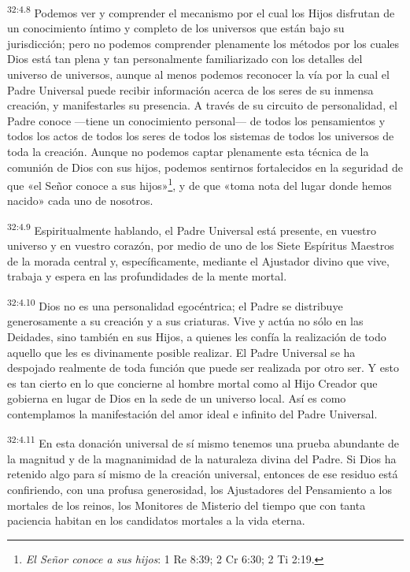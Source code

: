 \par
\textsuperscript{32:4.8} Podemos ver y comprender el mecanismo por el cual los Hijos disfrutan de un conocimiento íntimo y completo de los universos que están bajo su jurisdicción; pero no podemos comprender plenamente los métodos por los cuales Dios está tan plena y tan personalmente familiarizado con los detalles del universo de universos, aunque al menos podemos reconocer la vía por la cual el Padre Universal puede recibir información acerca de los seres de su inmensa creación, y manifestarles su presencia. A través de su circuito de personalidad, el Padre conoce ---tiene un conocimiento personal--- de todos los pensamientos y todos los actos de todos los seres de todos los sistemas de todos los universos de toda la creación. Aunque no podemos captar plenamente esta técnica de la comunión de Dios con sus hijos, podemos sentirnos fortalecidos en la seguridad de que «el Señor conoce a sus hijos»\footnote{\textit{El Señor conoce a sus hijos}: 1 Re 8:39; 2 Cr 6:30; 2 Ti 2:19.}, y de que «toma nota del lugar donde hemos nacido» cada uno de nosotros.

\par
\textsuperscript{32:4.9} Espiritualmente hablando, el Padre Universal está presente, en vuestro universo y en vuestro corazón, por medio de uno de los Siete Espíritus Maestros de la morada central y, específicamente, mediante el Ajustador divino que vive, trabaja y espera en las profundidades de la mente mortal.

\par
\textsuperscript{32:4.10} Dios no es una personalidad egocéntrica; el Padre se distribuye generosamente a su creación y a sus criaturas. Vive y actúa no sólo en las Deidades, sino también en sus Hijos, a quienes les confía la realización de todo aquello que les es divinamente posible realizar. El Padre Universal se ha despojado realmente de toda función que puede ser realizada por otro ser. Y esto es tan cierto en lo que concierne al hombre mortal como al Hijo Creador que gobierna en lugar de Dios en la sede de un universo local. Así es como contemplamos la manifestación del amor ideal e infinito del Padre Universal.

\par
\textsuperscript{32:4.11} En esta donación universal de sí mismo tenemos una prueba abundante de la magnitud y de la magnanimidad de la naturaleza divina del Padre. Si Dios ha retenido algo para sí mismo de la creación universal, entonces de ese residuo está confiriendo, con una profusa generosidad, los Ajustadores del Pensamiento a los mortales de los reinos, los Monitores de Misterio del tiempo que con tanta paciencia habitan en los candidatos mortales a la vida eterna.

